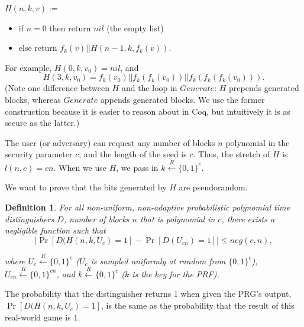 \documentclass[12pt,lot, lof]{puthesis}
\newenvironment{game}
{ \begin{itemize}[noitemsep,nolistsep] 
}
{ \end{itemize}                  }
\newcommand{\f}{\frac}
\newcommand{\bt}{\{0,1\}}
\newtheorem{dfn}[thm]{Definition}
\begin{document}
$H(n, k, v) :=$
\begin{game}
\item[] if $n = 0$ then return $nil$ (the empty list)
\item[] else return $f_k(v) || H(n-1, k, f_k(v)).$\\
\end{game}

For example, $H(0,k, v_0) = nil$, and $$H(3, k, v_0) = f_k(v_0) || f_k(f_k(v_0)) || f_k(f_k(f_k(v_0))).$$ (Note one difference between $H$ and the loop in $Generate$: $H$ prepends generated blocks, whereas $Generate$ appends generated blocks. We use the former construction because it is easier to reason about in Coq, but intuitively it is as secure as the latter.) %

The user (or adversary) can request any number of blocks $n$ polynomial in the security parameter $c$, and the length of the seed is $c$. Thus, the stretch of $H$ is $l(n, c) = cn$. When we use $H$, we pass in $k \xleftarrow{R} \bt^c$.

We want to prove that the bits generated by $H$ are pseudorandom. 


\begin{dfn}For all non-uniform, non-adaptive probabilistic polynomial time distinguishers $D$, number of blocks $n$ that is polynomial in $c$, there exists a negligible function such that
$$| \Pr [ D (H (n, k, U_c) = 1] - \Pr [ D(U_{cn}) = 1] | \leq neg(c,n),$$

where $U_c \xleftarrow{R} \{0,1\}^c$ ($U_c$ is sampled uniformly at random from $\{0,1\}^c$), $U_{cn} \xleftarrow{R} \{0,1\}^{cn}$, and $k \xleftarrow{R} \{0,1\}^c$ ($k$ is the key for the PRF).\end{dfn}


The probability that the distinguisher returns $1$ when given the PRG's output, $\Pr[D(H(n, k,  U_c) = 1]$, is the same as the probability that the result of this real-world game is $1$. \\
\end{document}
